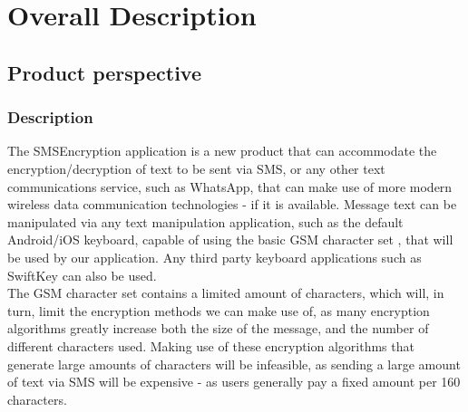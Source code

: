 \section{Overall Description}

\subsection{Product perspective}

\subsubsection{Description}
The SMSEncryption application is a new product that can accommodate the encryption/decryption of text to be sent via SMS, or any other text communications service, such as WhatsApp, that can make use of more modern wireless data communication technologies - if it is available. Message text can be manipulated via any text manipulation application, such as the default Android/iOS keyboard, capable of using the basic GSM character set , that will be used by our application. Any third party keyboard applications such as SwiftKey can also be used.
\vspace{12pt}\\
The GSM character set contains a limited amount of characters, which will, in turn, limit the encryption methods we can make use of, as many encryption algorithms greatly increase both the size of the message, and the number of different characters used. Making use of these encryption algorithms that generate large amounts of characters will be infeasible, as sending a large amount of text via SMS will be expensive - as users generally pay a fixed amount per 160 characters.
\newpage
